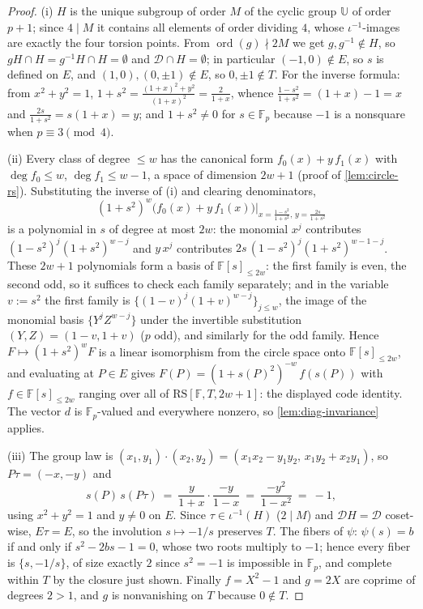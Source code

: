 \documentclass[11pt]{article}
\theoremstyle{definition}
\theoremstyle{remark}
\newcommand{\F}{\mathbb{F}}
\newcommand{\RS}{\mathrm{RS}}
\newcommand{\UU}{\mathbb{U}}
\begin{document}
\begin{proof}
(i) $H$ is the unique subgroup of order $M$ of the cyclic group $\UU$ of order $p+1$; since $4\mid M$ it contains all elements of order dividing $4$, whose $\iota^{-1}$-images are exactly the four torsion points. From $\operatorname{ord}(g)\nmid2M$ we get $g,g^{-1}\notin H$, so $gH\cap H=g^{-1}H\cap H=\emptyset$ and $\mathcal D\cap H=\emptyset$; in particular $(-1,0)\notin E$, so $s$ is defined on $E$, and $(1,0),(0,\pm1)\notin E$, so $0,\pm1\notin T$. For the inverse formula: from $x^2+y^2=1$, $1+s^2=\frac{(1+x)^2+y^2}{(1+x)^2}=\frac2{1+x}$, whence $\frac{1-s^2}{1+s^2}=(1+x)-1=x$ and $\frac{2s}{1+s^2}=s(1+x)=y$; and $1+s^2\ne0$ for $s\in\F_p$ because $-1$ is a nonsquare when $p\equiv3\pmod4$.

(ii) Every class of degree $\le w$ has the canonical form $f_0(x)+y\,f_1(x)$ with $\deg f_0\le w$, $\deg f_1\le w-1$, a space of dimension $2w+1$ \textup(proof of \cref{lem:circle-rs}\textup). Substituting the inverse of (i) and clearing denominators,
\[
(1+s^2)^w\bigl(f_0(x)+y\,f_1(x)\bigr)\Big|_{x=\frac{1-s^2}{1+s^2},\,y=\frac{2s}{1+s^2}}
\]
is a polynomial in $s$ of degree at most $2w$: the monomial $x^j$ contributes $(1-s^2)^j(1+s^2)^{w-j}$ and $y\,x^j$ contributes $2s\,(1-s^2)^j(1+s^2)^{w-1-j}$. These $2w+1$ polynomials form a basis of $\F[s]_{\le2w}$: the first family is even, the second odd, so it suffices to check each family separately; and in the variable $v:=s^2$ the first family is $\{(1-v)^j(1+v)^{w-j}\}_{j\le w}$, the image of the monomial basis $\{Y^jZ^{w-j}\}$ under the invertible substitution $(Y,Z)=(1-v,1+v)$ \textup($p$ odd\textup), and similarly for the odd family. Hence $F\mapsto(1+s^2)^wF$ is a linear isomorphism from the circle space onto $\F[s]_{\le2w}$, and evaluating at $P\in E$ gives $F(P)=(1+s(P)^2)^{-w}\,f(s(P))$ with $f\in\F[s]_{\le2w}$ ranging over all of $\RS[\F,T,2w+1]$: the displayed code identity. The vector $d$ is $\F_p$-valued and everywhere nonzero, so \cref{lem:diag-invariance} applies.

(iii) The group law is $(x_1,y_1)\cdot(x_2,y_2)=(x_1x_2-y_1y_2,\,x_1y_2+x_2y_1)$, so $P\tau=(-x,-y)$ and
\[
s(P)\,s(P\tau)\ =\ \frac y{1+x}\cdot\frac{-y}{1-x}\ =\ \frac{-y^2}{1-x^2}\ =\ -1,
\]
using $x^2+y^2=1$ and $y\ne0$ on $E$. Since $\tau\in\iota^{-1}(H)$ \textup($2\mid M$\textup) and $\mathcal D H=\mathcal D$ coset-wise, $E\tau=E$, so the involution $s\mapsto-1/s$ preserves $T$. The fibers of $\psi$: $\psi(s)=b$ if and only if $s^2-2bs-1=0$, whose two roots multiply to $-1$; hence every fiber is $\{s,-1/s\}$, of size exactly $2$ since $s^2=-1$ is impossible in $\F_p$, and complete within $T$ by the closure just shown. Finally $f=X^2-1$ and $g=2X$ are coprime of degrees $2>1$, and $g$ is nonvanishing on $T$ because $0\notin T$.
\end{proof}
\end{document}
